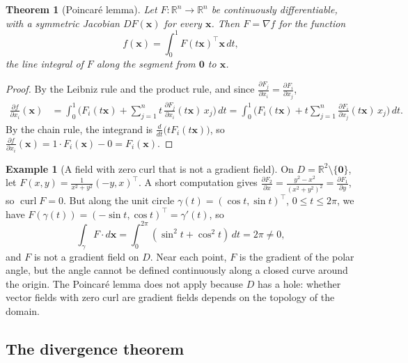 \documentclass[11pt]{article}
\theoremstyle{definition}
\newtheorem{example}[definition]{Example}
\theoremstyle{plain}
\newtheorem{theorem}[definition]{Theorem}
\theoremstyle{remark}
\DeclareMathOperator{\curl}{curl}
\begin{document}
\begin{theorem}[Poincar\'e lemma]\label{thm:poincare}
    Let $F: \mathbb{R}^n \to \mathbb{R}^n$ be continuously differentiable, with a symmetric Jacobian $DF(\mathbf{x})$ for every $\mathbf{x}$. Then $F = \nabla f$ for the function
    \[f(\mathbf{x}) = \int_0^1 F(t\mathbf{x})^\top\mathbf{x}\, dt,\]
    the line integral of $F$ along the segment from $\mathbf{0}$ to $\mathbf{x}$.
\end{theorem}

\begin{proof}
    By the Leibniz rule and the product rule, and since $\frac{\partial F_j}{\partial x_i} = \frac{\partial F_i}{\partial x_j}$,
    \begin{align*}
        \frac{\partial f}{\partial x_i}(\mathbf{x}) &= \int_0^1 \Big(F_i(t\mathbf{x}) + \sum_{j=1}^n t\,\frac{\partial F_j}{\partial x_i}(t\mathbf{x})\,x_j\Big)\, dt = \int_0^1 \Big(F_i(t\mathbf{x}) + t\sum_{j=1}^n \frac{\partial F_i}{\partial x_j}(t\mathbf{x})\,x_j\Big)\, dt.
    \end{align*}
    By the chain rule, the integrand is $\frac{d}{dt}\big(tF_i(t\mathbf{x})\big)$, so $\frac{\partial f}{\partial x_i}(\mathbf{x}) = 1 \cdot F_i(\mathbf{x}) - 0 = F_i(\mathbf{x})$.
\end{proof}

\begin{example}[A field with zero curl that is not a gradient field]\label{ex:vortex}
    On $D = \mathbb{R}^2 \setminus \{\mathbf{0}\}$, let $F(x, y) = \frac{1}{x^2 + y^2}(-y, x)^\top$. A short computation gives $\frac{\partial F_2}{\partial x} = \frac{y^2 - x^2}{(x^2 + y^2)^2} = \frac{\partial F_1}{\partial y}$, so $\curl F = 0$. But along the unit circle $\gamma(t) = (\cos t, \sin t)^\top$, $0 \leq t \leq 2\pi$, we have $F(\gamma(t)) = (-\sin t, \cos t)^\top = \gamma'(t)$, so
    \[\int_\gamma F \cdot d\mathbf{x} = \int_0^{2\pi} (\sin^2 t + \cos^2 t)\, dt = 2\pi \neq 0,\]
    and $F$ is not a gradient field on $D$. Near each point, $F$ is the gradient of the polar angle, but the angle cannot be defined continuously along a closed curve around the origin. The Poincar\'e lemma does not apply because $D$ has a hole: whether vector fields with zero curl are gradient fields depends on the topology of the domain.
\end{example}

\subsection{The divergence theorem}
\end{document}
